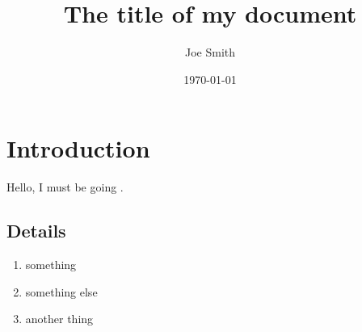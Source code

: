 \documentclass[12pt,letterpaper]{article}
\title{The title of my document}
\author{Joe Smith}
\date{\today}
\begin{document}
\maketitle

\lipsum[1]

\section{Introduction}

\lipsum[2]

Hello, I must be going \citep{Mattar:2005}.

\lipsum[3-4]

\subsection{Details}

\lipsum[5-7]

\begin{enumerate}
\item something
\item something else
\item another thing
\end{enumerate}

\lipsum[8-12]



\end{document}
